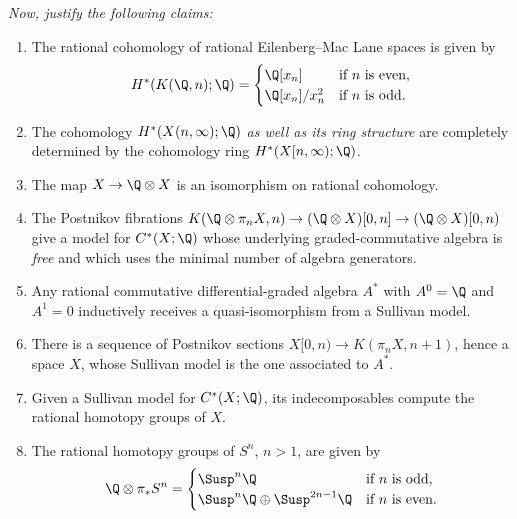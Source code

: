 \begin{problem}
\vspace{\baselineskip}
\noindent \textit{Now, justify the following claims:}
\begin{enumerate}
    \item The rational cohomology of rational Eilenberg--Mac Lane spaces is given by \[H^*(K(\Q, n); \Q) = \begin{cases} \Q[x_n] & \text{if $n$ is even}, \\ \Q[x_n] / x_n^2 & \text{if $n$ is odd}. \end{cases}\]
    \item The cohomology $H^*(X(n, \infty); \Q)$ \emph{as well as its ring structure} are completely determined by the cohomology ring $H^*(X[n, \infty); \Q)$.
    \item The map $X \to \Q \otimes X$ is an isomorphism on rational cohomology.
    \item The Postnikov fibrations $K(\Q \otimes \pi_n X, n) \to (\Q \otimes X)[0, n] \to (\Q \otimes X)[0, n)$ give a model for $C^*(X; \Q)$ whose underlying graded-commutative algebra is \emph{free} and which uses the minimal number of algebra generators.
    \item Any rational commutative differential-graded algebra $A^*$ with $A^0 = \Q$ and $A^1 = 0$ inductively receives a quasi-isomorphism from a Sullivan model.
    \item There is a sequence of Postnikov sections $X[0, n) \to K(\pi_n X, n+1)$, hence a space $X$, whose Sullivan model is the one associated to $A^*$.
    \item Given a Sullivan model for $C^*(X; \Q)$, its indecomposables compute the rational homotopy groups of $X$.
    \item The rational homotopy groups of $S^n$, $n > 1$, are given by \[\Q \otimes \pi_* S^n = \begin{cases} \Susp^n \Q & \text{if $n$ is odd}, \\ \Susp^n \Q \oplus \Susp^{2n-1} \Q & \text{if $n$ is even}. \end{cases}\]
\end{enumerate}
\end{problem}

